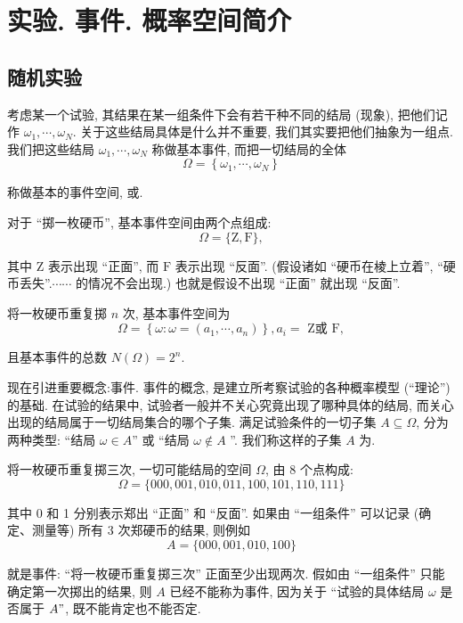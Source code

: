 \section{实验. 事件. 概率空间简介}
\subsection{随机实验}

考虑某一个试验, 其结果在某一组条件下会有若干种不同的结局 (现象), 把他们记作 $\omega_1, \cdots, \omega_N.$ 关于这些结局具体是什么并不重要, 我们其实要把他们抽象为一组点. 我们把这些结局 $\omega_1, \cdots, \omega_N$ 称做基本事件, 而把一切结局的全体
$$
\Omega=\left\{\omega_1, \cdots, \omega_N\right\}
$$

称做基本的事件空间, 或.

\begin{example}
    对于 ``掷一枚硬币'', 基本事件空间由两个点组成:
$$
\Omega=\{\mathrm{Z}, \mathrm{F}\},
$$

其中 Z 表示出现 ``正面'', 而 $\mathrm{F}$ 表示出现 ``反面''. (假设诸如 ``硬币在棱上立着'', ``硬币丢失''.$\cdots \cdots$ 的情况不会出现.) 也就是假设不出现 ``正面'' 就出现 ``反面''.

    将一枚硬币重复掷 $n$ 次, 基本事件空间为
$$
\Omega=\left\{\omega: \omega=\left(a_1, \cdots, a_n\right)\right\}, a_i=\text { Z或 } \mathrm{F},
$$

且基本事件的总数 $N(\Omega)=2^n$.
\end{example}

现在引进重要概念:事件. 事件的概念, 是建立所考察试验的各种概率模型 (``理论'') 的基础. 在试验的结果中, 试验者一般并不关心究竟出现了哪种具体的结局, 而关心出现的结局属于一切结局集合的哪个子集. 满足试验条件的一切子集 $A \subseteq \Omega$, 分为两种类型: ``结局 $\omega \in A$'' 或 ``结局 $\omega \notin A$ ''. 我们称这样的子集 $A$ 为.

\begin{example}
    将一枚硬币重复掷三次, 一切可能结局的空间 $\Omega$, 由 8 个点构成:
$$
\Omega=\{000,001,010,011,100,101,110,111\}
$$

其中 0 和 1 分别表示郑出 ``正面'' 和 ``反面''. 如果由 ``一组条件'' 可以记录 (确定、测量等) 所有 3 次郑硬币的结果, 则例如
$$
A=\{000,001,010,100\}
$$

就是事件: ``将一枚硬币重复掷三次'' 正面至少出现两次. 假如由 ``一组条件'' 只能确定第一次掷出的结果, 则 $A$ 已经不能称为事件, 因为关于 ``试验的具体结局 $\omega$ 是否属于 $A "$, 既不能肯定也不能否定.
\end{example}

